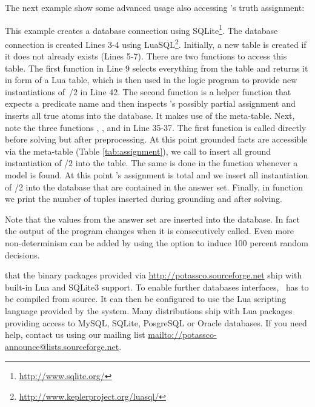 \begin{example}
The next example show some advanced usage also accessing \clasp's truth assignment:

This example creates a database connection using SQLite\footnote{\url{http://www.sqlite.org/}}.
The database connection is created Lines 3-4 using LuaSQL\footnote{\url{http://www.keplerproject.org/luasql/}}.
Initially, a new table  is created if it does not already exists (Lines 5-7).
There are two functions to access this table.
The first function  in Line 9 selects everything from the table and 
returns it in form of a Lua table, which is then used in the logic program
to provide new instantiations of~/$2$ in Line 42.
The second function  is a helper function that expects a predicate name
and then inspects \clingo's possibly partial assignment and
inserts all true atoms into the database.
It makes use of the  meta-table.
Next, note the three functions
,
, and
in Line 35-37.
The first function is called directly before solving but after preprocessing.
At this point grounded facts are accessible via the  meta-table (Table \ref{tab:assignment}),
we call  to insert all ground instantiation of /$2$ into the  table.
The same is done in the  function whenever a model is found.
At this point \clingo's assignment is total and 
we insert all instantiation of /2 into the database that are contained in the answer set.
Finally, in function  we print the number of tuples inserted during grounding and after solving.

Note that the values from the answer set are inserted into the database.
In fact the output of the program changes when it is consecutively called.
Even more non-determinism can be added by using the option 
to induce 100 percent random decisions.
\eexample
\end{example}

\begin{Note}
	that the binary packages provided via \url{http://potassco.sourceforge.net} ship with built-in Lua and SQLite3 support.
	To enable further databases interfaces,	\gringo\ has to be compiled from source. 
	It can then be configured to use the Lua scripting language provided by the system. 
	Many distributions ship with Lua packages providing access to MySQL, SQLite, PosgreSQL or Oracle databases.
	If you need help, contact us using our mailing list \url{mailto://potassco-announce@lists.sourceforge.net}.
\end{Note}



